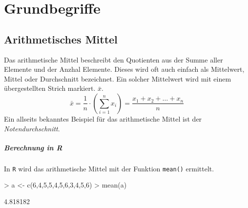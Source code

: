 



\chapter{Grundbegriffe}
\newpage


\section{Arithmetisches Mittel}
Das \gls{arithmetische Mittel} beschreibt den Quotienten aus 
der Summe aller Elemente und der Anzhal Elemente. Dieses wird oft auch
einfach als Mittelwert, \gls{Mittel} oder \gls{Durchschnitt} bezeichnet. 
Ein solcher Mittelwert wird mit einem übergestellten Strich  
markiert.
$\bar{x}$.
\[ 
	\bar{x} 
	= \frac{1}{n} \cdot \left( \sum_{i=1}^{n} x_i \right)
	= \frac{x_1 + x_2 + \dots + x_n}{n}
\]
Ein allseits bekanntes Beispiel für das arithmetische Mittel ist der 
\emph{Notendurchschnitt}. 

\paragraph{Berechnung in R}
In \lstinline{R} wird das arithmetische Mittel mit der Funktion 
\lstinline{mean()} ermittelt.
\begin{Schunk}
\begin{Sinput}
> a <- c(6,4,5,5,4,5,6,3,4,5,6)
> mean(a)
\end{Sinput}
\begin{Soutput}
[1] 4.818182
\end{Soutput}
\end{Schunk}

